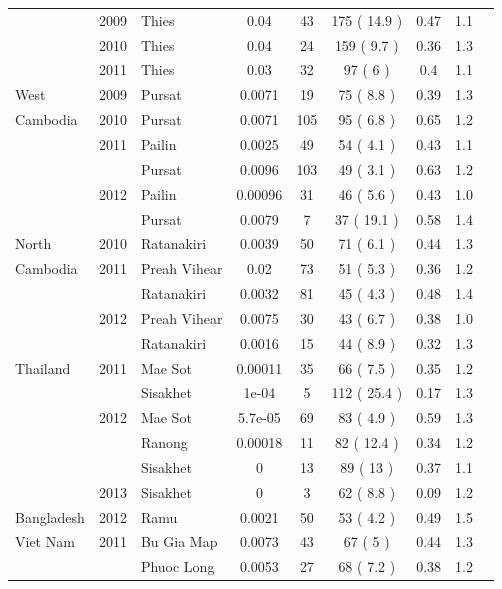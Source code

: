 \documentclass[9pt,lineno]{elife}
\begin{document}
\begin{table}[btp]
{\begin{tabular}{p{1.3cm} c p{1.8cm} c | c c c c p{2.7cm}}
        & 2009 & Thies & 0.04 & 43 & 175 ( 14.9 )& 0.47 & 1.1  &\\
        & 2010 & Thies & 0.04 & 24 & 159 ( 9.7 )& 0.36 & 1.3 &\\
        & 2011 & Thies & 0.03 & 32 & 97 ( 6 )& 0.4 & 1.1 &\\
\hline
\hline
West     & 2009 & Pursat & 0.0071 & 19 & 75 ( 8.8 )& 0.39 & 1.3 &\multirow{3}{*}{\parbox{3.4cm}{\citet{Amato2017, eLife2016}}}\\
Cambodia & 2010 & Pursat & 0.0071 & 105 & 95 ( 6.8 )& 0.65 & 1.2&\\
         & 2011 & Pailin & 0.0025 & 49 & 54 ( 4.1 )& 0.43 & 1.1&\\
         &      & Pursat & 0.0096 & 103 & 49 ( 3.1 )& 0.63 & 1.2&\\
         & 2012 & Pailin & 0.00096 & 31 & 46 ( 5.6 )& 0.43 & 1.0&\\
         &      & Pursat & 0.0079 & 7 & 37 ( 19.1 )& 0.58 & 1.4&\\
\cline{1-8}
North & 2010 & Ratanakiri & 0.0039 & 50 & 71 ( 6.1 )& 0.44 & 1.3&\\
Cambodia  & 2011 & Preah Vihear & 0.02 & 73 & 51 ( 5.3 )& 0.36 & 1.2&\\
          &      & Ratanakiri & 0.0032 & 81 & 45 ( 4.3 )& 0.48 & 1.4&\\
          & 2012 & Preah Vihear & 0.0075 & 30 & 43 ( 6.7 )& 0.38 & 1.0&\\
          &      & Ratanakiri & 0.0016 & 15 & 44 ( 8.9 )& 0.32 & 1.3&\\
\hline
Thailand & 2011 & Mae Sot & 0.00011 & 35 & 66 ( 7.5 )& 0.35 & 1.2 &\multirow{3}{*}{\parbox{3.4cm}{\citet{Miotto2013, eLife2016}}}\\
         &      & Sisakhet & 1e-04 & 5 & 112 ( 25.4 )& 0.17 & 1.3 &\\
         & 2012 & Mae Sot & 5.7e-05 & 69 & 83 ( 4.9 )& 0.59 & 1.3 &\\
         &      & Ranong & 0.00018 & 11 & 82 ( 12.4 )& 0.34 & 1.2 &\\
         &      & Sisakhet & 0 & 13 & 89 ( 13 )& 0.37 & 1.1 &\\
         & 2013 & Sisakhet & 0 & 3 & 62 ( 8.8 )& 0.09 & 1.2&\\
\cline{1-8}
Bangladesh & 2012 & Ramu & 0.0021 & 50 & 53 ( 4.2 )& 0.49 & 1.5 &\\
\cline{1-8}
Viet Nam & 2011 & Bu Gia Map & 0.0073 & 43 & 67 ( 5 )& 0.44 & 1.3&\\
         &      & Phuoc Long & 0.0053 & 27 & 68 ( 7.2 )& 0.38 & 1.2&\\

\end{tabular}}
\end{table}
\end{document}
